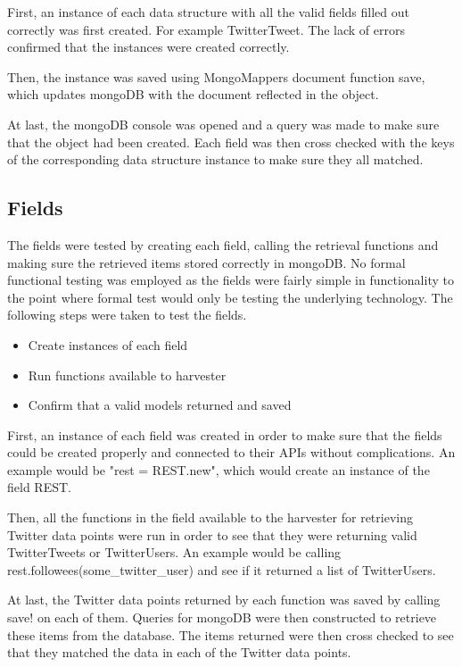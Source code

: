 First, an instance of each data structure with all the valid fields filled out correctly was first created. For example TwitterTweet. The lack of errors confirmed that the instances were created correctly.

Then, the instance was saved using MongoMappers document function save, which updates mongoDB with the document reflected in the object.

At last, the mongoDB console was opened and a query was made to make sure that the object had been created. Each field was then cross checked with the keys of the corresponding data structure instance to make sure they all matched.

\subsection{Fields}
The fields were tested by creating each field, calling the retrieval functions and making sure the retrieved items stored correctly in mongoDB. No formal functional testing was employed as the fields were fairly simple in functionality to the point where formal test would only be testing the underlying technology. The following steps were taken to test the fields.

	\begin{itemize}
	\item Create instances of each field
	\item Run functions available to harvester
	\item Confirm that a valid models returned and saved
	\end{itemize}

First, an instance of each field was created in order to make sure that the fields could be created properly and connected to their APIs without complications. An example would be "rest = REST.new", which would create an instance of the field REST.

Then, all the functions in the field available to the harvester for retrieving Twitter data points were run in order to see that they were returning valid TwitterTweets or TwitterUsers. An example would be calling rest.followees(some\_twitter\_user) and see if it returned a list of TwitterUsers.

At last, the Twitter data points returned by each function was saved by calling save! on each of them. Queries for mongoDB were then constructed to retrieve these items from the database. The items returned were then cross checked to see that they matched the data in each of the Twitter data points.

